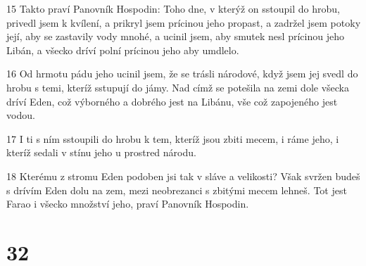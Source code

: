 \par 15 Takto praví Panovník Hospodin: Toho dne, v kterýž on sstoupil do hrobu, privedl jsem k kvílení, a prikryl jsem prícinou jeho propast, a zadržel jsem potoky její, aby se zastavily vody mnohé, a ucinil jsem, aby smutek nesl prícinou jeho Libán, a všecko dríví polní prícinou jeho aby umdlelo.
\par 16 Od hrmotu pádu jeho ucinil jsem, že se trásli národové, když jsem jej svedl do hrobu s temi, kteríž sstupují do jámy. Nad címž se potešila na zemi dole všecka dríví Eden, což výborného a dobrého jest na Libánu, vše což zapojeného jest vodou.
\par 17 I ti s ním sstoupili do hrobu k tem, kteríž jsou zbiti mecem, i ráme jeho, i kteríž sedali v stínu jeho u prostred národu.
\par 18 Kterému z stromu Eden podoben jsi tak v sláve a velikosti? Však svržen budeš s drívím Eden dolu na zem, mezi neobrezanci s zbitými mecem lehneš. Tot jest Farao i všecko množství jeho, praví Panovník Hospodin.

\chapter{32}

